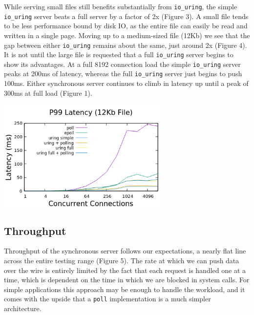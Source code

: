 \documentclass[conference]{IEEEtran}{}
\begin{document}
While serving small files still benefits substantially from \texttt{io\_uring}, the simple \texttt{io\_uring} server beats a full server by a factor of 2x (Figure 3). A small file tends to be less performance bound by disk IO, as the entire file can easily be read and written in a single page. Moving up to a medium-sized file (12Kb) we see that the gap between either \texttt{io\_uring} remains about the same, just around 2x (Figure 4). It is not until the large file is requested that a full \texttt{io\_uring} server begins to show its advantages. At a full 8192 connection load the simple \texttt{io\_uring} server peaks at 200ms of latency, whereas the full \texttt{io\_uring} server just begins to push 100ms. Either synchronous server continues to climb in latency up until a peak of 300ms at full load (Figure 1).

\begin{center}
\includegraphics[width=3.35in]{./med_latency.png}
\end{center}

\subsection{Throughput}
\label{sec:org1e7999b}
Throughput of the synchronous server follows our expectations, a nearly flat line across the entire testing range (Figure 5). The rate at which we can push data over the wire is entirely limited by the fact that each request is handled one at a time, which is dependent on the time in which we are blocked in system calls. For simple applications this approach may be enough to handle the workload, and it comes with the upside that a \texttt{poll} implementation is a much simpler architecture.
\end{document}
